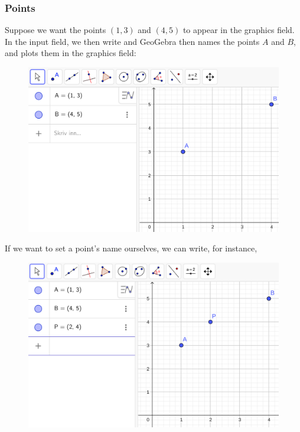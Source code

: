 \subsubsection{Points}
Suppose we want the points $ (1,3) $ and $ (4,5) $ to appear in the graphics field. In the input field, we then write
and \vs
{}
GeoGebra then names the points $ A $ and $ B $, and plots them in the graphics field:
\begin{figure}[H]
	\centering
	\includegraphics[scale=0.15]{pointAandB}
\end{figure}
If we want to set a point's name ourselves, we can write, for instance,
\begin{figure}[H]
	\centering
	\includegraphics[scale=0.15]{pointP}
\end{figure}
